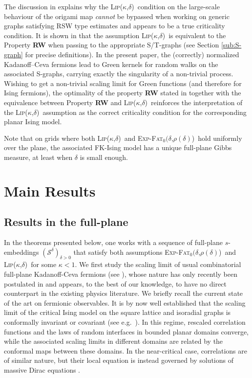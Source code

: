 \documentclass[reqno]{amsart}
\numberwithin{equation}{section}
\theoremstyle{definition}
\theoremstyle{remark}
\newcommand\cS{\mathcal{S}}
\def\LipKd{{\mbox{\textsc{Lip(}$\kappa$\textsc{,}$\delta$\textsc{)}}}}
\def\ExpFat{{{\mbox{\textsc{Exp-Fat}$_0(\delta$\textsc{,}$\rho(\delta)$\textsc{)}}}}}
\begin{document}
The discussion in \cite[Section~5.2]{Mah23} explains why the \LipKd\ condition on the large-scale behaviour of the origami map \emph{cannot} be bypassed when working on generic graphs satisfying RSW type estimates and appears to be a true criticality condition. 
It is shown in \cite{BCLR} that the assumption \LipKd\, is equivalent to the Property \textbf{RW} when passing to the appropriate S/T-graphs (see Section \ref{sub:S-graph} for precise definitions). In the present paper, the (correctly) normalized Kadanoff–Ceva fermions lead to Green kernels for random walks on the associated S-graphs, carrying exactly the singularity of a non-trivial process. Wishing to get a non-trivial scaling limit for Green functions (and therefore for Ising fermions), the optimality of the property \textbf{RW} stated in \cite[Theorem 3]{BCLR} together with the equivalence between Property \textbf{RW} and \LipKd\ reinforces the interpretation of the \LipKd\ assumption as the correct criticality condition for the corresponding planar Ising model.

Note that on grids where both \LipKd\ and \ExpFat\ hold uniformly over the plane, the associated FK-Ising model has a unique full-plane Gibbs measure, at least when $\delta$ is small enough.

\section{Main Results}
\subsection{Results in the full-plane}
In the theorems presented below, one works with a sequence of full-plane $s$-embeddings $(\cS^{\delta})_{\delta >0} $ that satisfy both assumptions \ExpFat\, and \LipKd\, for some $\kappa<1$. 
 We first study the scaling limit of usual combinatorial full-plane Kadanoff-Ceva fermions (see \cite{kadanoff-ceva-71, Mercat-CMP,CCK}), whose nature has only recently been postulated in \cite{CLR1,CLR2,Che20} and appears, to the best of our knowledge, to have no direct counterpart in the existing physics literature. We briefly recall the current state of the art on fermionic observables. It is by now well established that the scaling limit of the critical Ising model on the square lattice and isoradial graphs is conformally invariant or covariant (see e.g.\ \cite{Smi-ICM06,Smirnov_Ising,ChSmi2,CHI,hon-smi,CHI-mixed}). In this regime, rescaled correlation functions and the laws of random interfaces in bounded planar domains converge, while the associated scaling limits in different domains are related by the conformal maps between these domains. In the near-critical case, correlations are of similar nature, but their local equation is instead governed by solutions of massive Dirac equations \cite{park-iso,park2018massive,Cim-universality,mccoy1977painleve,PVW25,WanPHD,park2025near,garban2025energy}.
\end{document}
